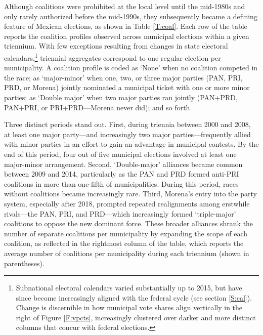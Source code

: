 \documentclass[letter,12pt]{article}
\begin{document}
Although coalitions were prohibited at the local level until the mid-1980s and only rarely authorized before the mid-1990s, they subsequently became a defining feature of Mexican elections, as shown in Table \ref{T:coal}. Each row of the table reports the coalition profiles observed across municipal elections within a given triennium. With few exceptions resulting from changes in state electoral calendars,\footnote{Subnational electoral calendars varied substantially up to 2015, but have since become increasingly aligned with the federal cycle (see section \ref{S:cal}). Change is discernible in how municipal vote shares align vertically in the right of Figure \ref{F:vpcts}, increasingly clustered over darker and more distinct columns that concur with federal elections.} triennial aggregates correspond to one regular election per municipality. A coalition profile is coded as `None' when no coalition competed in the race; as `major-minor' when one, two, or three major parties (PAN, PRI, PRD, or Morena) jointly nominated a municipal ticket with one or more minor parties; as `Double major' when two major parties ran jointly (PAN+PRD, PAN+PRI, or PRI+PRD---Morena never did); and so forth.

Three distinct periods stand out. First, during triennia between 2000 and 2008, at least one major party---and increasingly two major parties---frequently allied with minor parties in an effort to gain an advantage in municipal contests. By the end of this period, four out of five municipal elections involved at least one major-minor arrangement. Second, `Double-major' alliances became common between 2009 and 2014, particularly as the PAN and PRD formed anti-PRI coalitions in more than one-fifth of municipalities. During this period, races without coalitions became increasingly rare. Third, Morena's entry into the party system, especially after 2018, prompted repeated realignments among erstwhile rivals---the PAN, PRI, and PRD---which increasingly formed `triple-major' coalitions to oppose the new dominant force. These broader alliances shrank the number of separate coalitions per municipality by expanding the scope of each coalition, as reflected in the rightmost column of the table, which reports the average number of coalitions per municipality during each triennium (shown in parentheses).

\end{document}
